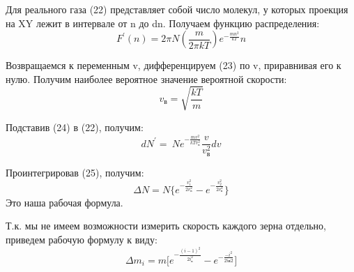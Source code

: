\documentclass[a4paper,12pt]{article}
\begin{document}
Для реального газа (22) представляет собой число молекул, у которых проекция на XY лежит в интервале от n до dn. Получаем функцию распределения:
\begin{equation}
F^\prime\left(n\right)=2\pi N\left(\frac{m}{2\pi kT}\right)e^{-\frac{mn^2}{kT}}n
\end{equation}

Возвращаемся к переменным v, дифференцируем (23) по v, приравнивая его к нулю. Получим наиболее вероятное значение вероятной скорости:
\begin{equation}
v_в=\sqrt{\frac{kT}{m}}
\end{equation}

Подставив (24) в (22), получим:
\begin{equation}
dN^\prime=\ Ne^{-\frac{mv^2}{kTv_в^2}}\frac{v}{v_в^2}dv 
\end{equation}

Проинтегрировав (25), получим:
\begin{equation}
\Delta N=N\bigg\{e^{-\frac{v_1^2}{2v_в^2}}- e^{-\frac{v_2^2}{2v_в^2}} \bigg\}     
\end{equation}
Это наша рабочая формула.

Т.к. мы не имеем возможности измерить скорость каждого зерна отдельно, приведем рабочую формулу к виду:
\begin{equation}
\Delta m_i=m\bigg[e^{-\frac{(i-1)^2}{2i_в^2}}- e^{-\frac{-i^2}{2iв2}}\bigg]
\end{equation}
\end{document}
